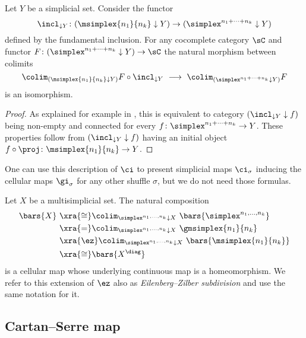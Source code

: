 Let $Y$ be a simplicial set.
Consider the functor
\[
\incl_{\downarrow Y} \colon (\msimplex{n_1}{n_k} \downarrow Y) \to (\simplex^{n_1+\dots+n_k} \downarrow Y)
\]
defined by the fundamental inclusion.
For any cocomplete category $\sC$ and functor $F \colon (\simplex^{n_1+\dots+n_k} \downarrow Y) \to \sC$ the natural morphism between colimits
\[
\colim_{(\msimplex{n_1}{n_k} \downarrow Y)} F \circ \incl_{\downarrow Y} \
\longrightarrow \
\colim_{(\simplex^{n_1+\dots+n_k} \downarrow Y)} F
\]
is an isomorphism.

\begin{proof}
	As explained for example in \cite[]{riehl2014categorical}, this is equivalent to category $(\incl_{\downarrow Y} \downarrow f)$ being non-empty and connected for every $f \colon \simplex^{n_1+\dots+n_k} \to Y$.
	These properties follow from $(\incl_{\downarrow Y} \downarrow f)$ having an initial object $f \circ \proj \colon \msimplex{n_1}{n_k} \to Y$.
\end{proof}


\newpage

One can use this description of $\ci$ to present simplicial maps $\ci_\sigma$ inducing the cellular maps $\gi_\sigma$ for any other shuffle $\sigma$, but we do not need those formulas.

Let $X$ be a multisimplicial set.
The natural composition
\begin{align*}
	\bars{X} \ &\xra{\cong}
	\colim_{\simplex^{n_1,\dots,n_k} \downarrow X} \ \bars{\simplex^{n_1,\dots,n_k}} \\ &\xra{=}
	\colim_{\simplex^{n_1,\dots,n_k} \downarrow X} \ \gmsimplex{n_1}{n_k} \\ &\xra{\ez}
	\colim_{\simplex^{n_1,\dots,n_k} \downarrow X} \ \bars{\msimplex{n_1}{n_k}} \\ &\xra{\cong}
	\bars{X^{\diag}}
\end{align*}
is a cellular map whose underlying continuous map is a homeomorphism.
We refer to this extension of $\ez$ also as \textit{Eilenberg--Zilber subdivision} and use the same notation for it.

\subsection{Cartan--Serre map} \label{ss:cartan-serre map}

